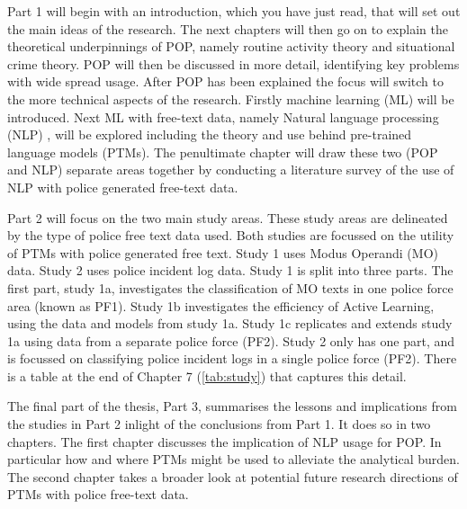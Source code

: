 Part 1 will begin with an introduction, which you have just read, that will set out the main ideas of the research. The next chapters will then go on to explain the theoretical underpinnings of POP, namely routine activity theory and situational crime theory. POP will then be discussed in more detail, identifying key problems with wide spread usage. After POP has been explained the focus will switch to the more technical aspects of the research. Firstly machine learning (ML) will be introduced. Next ML with free-text data, namely Natural language processing (NLP) , will be explored including the theory and use behind pre-trained language models (PTMs). The penultimate chapter will draw these two (POP and NLP) separate areas together by conducting a literature survey of the use of NLP with police generated free-text data. 

Part 2 will focus on the two main study areas. These study areas are delineated by the type of police free text data used. Both studies are focussed on the utility of PTMs with police generated free text. Study 1 uses Modus Operandi (MO) data. Study 2 uses police incident log data. Study 1 is split into three parts. The first part, study 1a, investigates the classification of MO texts in one police force area (known as PF1). Study 1b investigates the efficiency of Active Learning, using the data and models from study 1a. Study 1c replicates and extends study 1a using data from a separate police force (PF2). Study 2 only has one part, and is focussed on classifying police incident logs in a single police force (PF2). There is a table at the end of Chapter 7 (\ref{tab:study}) that captures this detail.

The final part of the thesis, Part 3, summarises the lessons and implications from the studies in Part 2 inlight of the conclusions from Part 1. It does so in two chapters. The first chapter discusses the implication of NLP usage for POP. In particular how and where PTMs might be used to alleviate the analytical burden. The second chapter takes a broader look at potential future research directions of PTMs with police free-text data.




